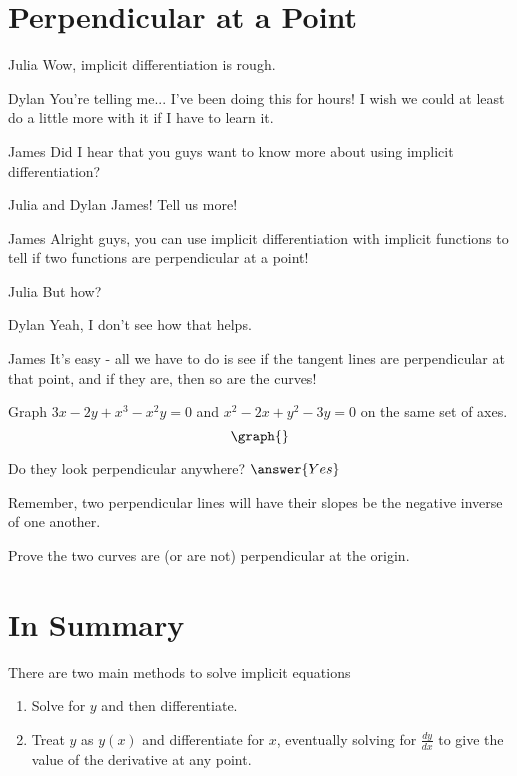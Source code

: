 \documentclass{ximera}
\begin{document}
\section{Perpendicular at a Point}
\begin{dialogue}
\item[Julia] Wow, implicit differentiation is rough.
\item[Dylan] You're telling me... I've been doing this for hours! I wish we could at least do a little more with it if I have to learn it.
\item[James] Did I hear that you guys want to know more about using implicit differentiation?
\item[Julia and Dylan] James! Tell us more!
\item[James] Alright guys, you can use implicit differentiation with implicit functions to tell if two functions are perpendicular at a point!
\item[Julia] But how?
\item[Dylan] Yeah, I don't see how that helps.
\item[James] It's easy - all we have to do is see if the tangent lines are perpendicular at that point, and if they are, then so are the curves!
\end{dialogue}
\begin{question}
Graph $3x - 2y + x^3-x^2y = 0$ and $x^2 - 2x + y^2 - 3y = 0$ on the same set of axes.
\[
\graph{}
\]

Do they look perpendicular anywhere?
$\answer{Yes}$
\end{question}
\begin{question}
\begin{hint}
Remember, two perpendicular lines will have their slopes be the negative inverse of one another.
\end{hint}
Prove the two curves are (or are not) perpendicular at the origin.
\begin{freeResponse}
\end{freeResponse}
\end{question}


\section{In Summary}
There are two main methods to solve implicit equations 
\begin{enumerate}
\item{Solve for $y$ and then differentiate.}
\item{Treat $y$ as $y(x)$ and differentiate for $x$, eventually solving for $\frac{dy}{dx}$ to give the value of the derivative at any point.}
\end{enumerate}
\pagebreak
\end{document}
